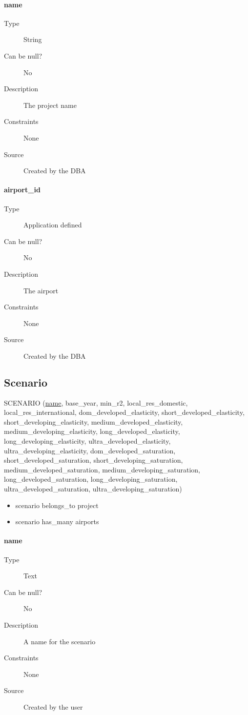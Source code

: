 \documentclass[]{report}
\begin{document}
\paragraph{name}
	\begin{description}
	\item[Type]String
	\item[Can be null?]No
	\item[Description]The project name
	\item[Constraints]None
	\item[Source]Created by the DBA
	\end{description}
\paragraph{airport\_id}
	\begin{description}
	\item[Type]Application defined
	\item[Can be null?]No
	\item[Description]The airport
	\item[Constraints]None
	\item[Source]Created by the DBA
	\end{description}
\subsection{Scenario}
SCENARIO (\underline{name}, base\_year, min\_r2, local\_res\_domestic, local\_res\_international, dom\_developed\_elasticity, short\_developed\_elasticity, short\_developing\_elasticity, medium\_developed\_elasticity, medium\_developing\_elasticity, long\_developed\_elasticity, long\_developing\_elasticity, ultra\_developed\_elasticity, ultra\_developing\_elasticity, dom\_developed\_saturation, short\_developed\_saturation, short\_developing\_saturation, medium\_developed\_saturation, medium\_developing\_saturation, long\_developed\_saturation, long\_developing\_saturation, ultra\_developed\_saturation, ultra\_developing\_saturation)
\begin{itemize}
\item scenario belongs\_to project
\item scenario has\_many airports
\end{itemize}
\paragraph{name}
	\begin{description}
	\item[Type]Text
	\item[Can be null?]No
	\item[Description]A name for the scenario
	\item[Constraints]None
	\item[Source]Created by the user
	\end{description}
\end{document}
